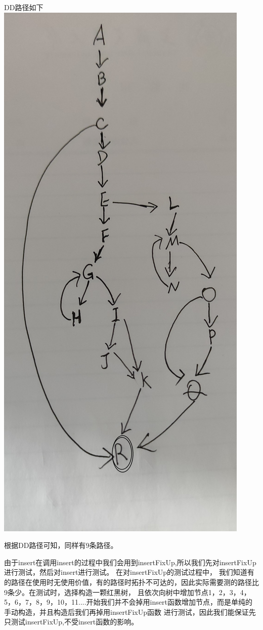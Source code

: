 \documentclass[12pt, a4paper, oneside]{ctexart}
\begin{document}
    DD路径如下
\includegraphics[scale=0.06]{screenshots/DD-insertFixUp.jpg}

根据DD路径可知，同样有9条路径。

由于insert在调用insert的过程中我们会用到insertFixUp,所以我们先对insertFixUp进行测试，然后对insert进行测试。
在对insertFixUp的测试过程中， 我们知道有的路径在使用时无使用价值，有的路径时拓扑不可达的，因此实际需要测的路径比9条少。在测试时，选择构造一颗红黑树，
且依次向树中增加节点1，2，3，4，5，6，7，8，9，10，11....开始我们并不会掉用insert函数增加节点，而是单纯的手动构造，并且构造后我们再掉用insertFixUp函数
进行测试，因此我们能保证先只测试insertFixUp,不受insert函数的影响。
\end{document}
